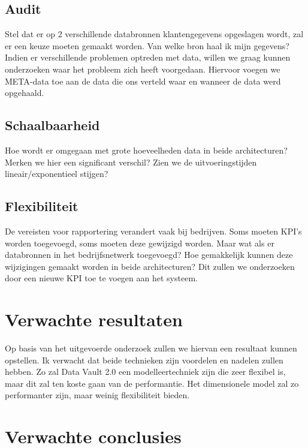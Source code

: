 \subsection{Audit}
Stel dat er op 2 verschillende databronnen klantengegevens opgeslagen wordt, zal er een keuze moeten gemaakt worden. Van welke bron haal ik mijn gegevens? Indien er verschillende problemen optreden met data, willen we graag kunnen onderzoeken waar het probleem zich heeft voorgedaan. Hiervoor voegen we META-data toe aan de data die ons verteld waar en wanneer de data werd opgehaald. 

\subsection{Schaalbaarheid}
Hoe wordt er omgegaan met grote hoeveelheden data in beide architecturen? Merken we hier een significant verschil? Zien we de uitvoeringstijden lineair/exponentieel stijgen? 

\subsection{Flexibiliteit}
De vereisten voor rapportering verandert vaak bij bedrijven. Soms moeten KPI's worden toegevoegd, soms moeten deze gewijzigd worden. Maar wat als er databronnen in het bedrijfsnetwerk toegevoegd? Hoe gemakkelijk kunnen deze wijzigingen gemaakt worden in beide architecturen? Dit zullen we onderzoeken door een nieuwe KPI toe te voegen aan het systeem. 
 


\section{Verwachte resultaten}
\label{sec:verwachte_resultaten}

Op basis van het uitgevoerde onderzoek zullen we hiervan een resultaat kunnen opstellen. Ik verwacht dat beide technieken zijn voordelen en nadelen zullen hebben. Zo zal Data Vault 2.0 een modelleertechniek zijn die zeer flexibel is, maar dit zal ten koste gaan van de performantie. Het dimensionele model zal zo performanter zijn, maar weinig flexibiliteit bieden.

\section{Verwachte conclusies}
\label{sec:verwachte_conclusies}

